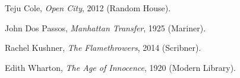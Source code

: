 \begin{description}

  \item Teju Cole, \textit{Open City}, 2012 (Random House).
  \item John Dos Passos, \textit{Manhattan Transfer}, 1925 (Mariner).
  \item Rachel Kushner, \textit{The Flamethrowers}, 2014 (Scribner).
  \item Edith Wharton, \textit{The Age of Innocence}, 1920 (Modern Library).

\end{description}
